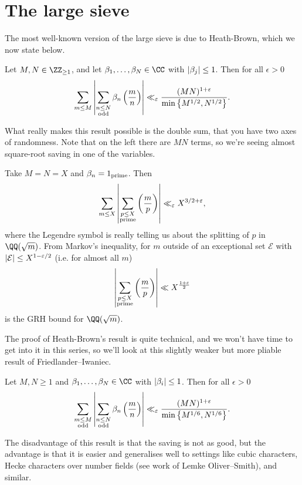 \documentclass{lecturenotes}
\numberwithin{equation}{section}
\begin{document}
\section{The large sieve}
The most well-known version of the large sieve is due to Heath-Brown, which we now state below.
\begin{theorem}
    Let $M,N\in\ZZ_{\geq 1}$, and let $\beta_1,\dots,\beta_N\in\CC$ with $\left|{\beta_j}\right|\leq 1$.  Then for all $\epsilon>0$
    \[\sum_{m\leq M}\left|{\sum_{\substack{n\leq N\\\textnormal{odd}}}\beta_n\left(\frac{m}{n}\right)}\right|\ll_\varepsilon\frac{(MN)^{1+\varepsilon}}{\min\left\{{M^{1/2},N^{1/2}}\right\}}.\]
\end{theorem}
What really makes this result possible is the double sum, that you have two axes of randomness.  Note that on the left there are $MN$ terms, so we're seeing almost square-root saving in one of the variables.
\begin{example}
    Take $M=N=X$ and $\beta_n=1_{\textnormal{prime}}$.  Then
    \[\sum_{m\leq X}\left|{\sum_{\substack{p\leq X\\\textnormal{prime}}}\left(\frac{m}{p}\right)}\right|\ll_\varepsilon X^{3/2+\varepsilon},\]
    where the Legendre symbol is really telling us about the splitting of $p$ in $\QQ(\sqrt{m})$.  From Markov's inequality, for $m$ outside of an exceptional set $\mathcal{E}$ with $\left|{\mathcal{E}}\right|\leq X^{1-\varepsilon/2}$ (i.e. for almost all $m$)
    \[\left|{\sum_{\substack{p\leq X\\\textnormal{prime}}}\left(\frac{m}{p}\right)}\right|\ll X^{\frac{1+\varepsilon}{2}}\]
    is the GRH bound for $\QQ(\sqrt{m})$.
\end{example}
The proof of Heath-Brown's result is quite technical, and we won't have time to get into it in this series, so we'll look at this slightly weaker but more pliable result of Friedlander--Iwaniec.
\begin{theorem}\label{thm:FIsieve}
    Let $M,N\geq 1$ and $\beta_1,\dots,\beta_N\in\CC$ with $\left|{\beta_i}\right|\leq 1$.  Then for all $\epsilon>0$
    \[\sum_{\substack{m\leq M\\\textnormal{odd}}}\left|{\sum_{\substack{n\leq N\\\textnormal{odd}}}\beta_n\left(\frac{m}{n}\right)}\right|\ll_\varepsilon \frac{(MN)^{1+\varepsilon}}{\min\left\{{M^{1/6},N^{1/6}}\right\}}.\]
\end{theorem}
The disadvantage of this result is that the saving is not as good, but the advantage is that it is easier and generalises well to settings like cubic characters, Hecke characters over number fields (see work of Lemke Oliver--Smith), and similar.
\end{document}
